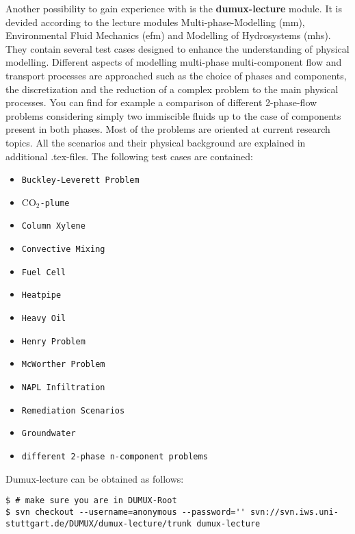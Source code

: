 Another possibility to gain experience with \Dumux is the \textbf{dumux-lecture} module. It is devided according to
the lecture modules Multi-phase-Modelling (mm), Environmental Fluid Mechanics (efm) and Modelling of Hydrosystems (mhs). 
They contain several test cases designed to enhance the understanding of physical modelling. 
Different aspects of modelling multi-phase multi-component flow and transport processes are approached such as the 
choice of phases and components, the discretization and the reduction of a complex problem to the main physical 
processes. You can find for example a comparison of different 2-phase-flow problems considering simply two immiscible 
fluids up to the case of components present in both phases. Most of the problems are oriented at current research topics.
All the scenarios and their physical background are explained in additional .tex-files. The following test cases are 
contained:
\begin{itemize}
\item \texttt{Buckley-Leverett Problem}
\item \texttt{$\text{CO}_2$-plume}
\item \texttt{Column Xylene}
\item \texttt{Convective Mixing}
\item \texttt{Fuel Cell}
\item \texttt{Heatpipe}
\item \texttt{Heavy Oil}
\item \texttt{Henry Problem}
\item \texttt{McWorther Problem}
\item \texttt{NAPL Infiltration}
\item \texttt{Remediation Scenarios}
\item \texttt{Groundwater}
\item \texttt{different 2-phase n-component problems}
\end{itemize}

 
Dumux-lecture can be obtained as follows:
\begin{lstlisting}[style=Bash]
$ # make sure you are in DUMUX-Root
$ svn checkout --username=anonymous --password='' svn://svn.iws.uni-stuttgart.de/DUMUX/dumux-lecture/trunk dumux-lecture
\end{lstlisting}


